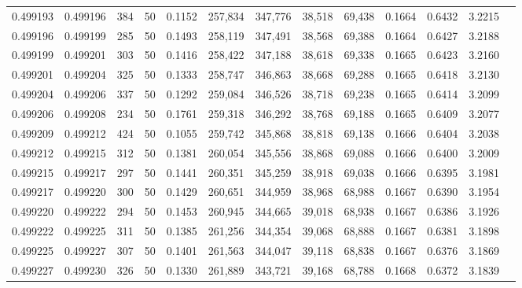 \begin{tabular}{rrrrrrrrrrrrr}
0.499193 & 0.499196 & 384 &  50 &                                     0.1152 & 257,834 & 347,776 &  38,518 &  69,438 & 0.1664 & 0.6432 & 3.2215 \\
0.499196 & 0.499199 & 285 &  50 &                                     0.1493 & 258,119 & 347,491 &  38,568 &  69,388 & 0.1664 & 0.6427 & 3.2188 \\
0.499199 & 0.499201 & 303 &  50 &                                     0.1416 & 258,422 & 347,188 &  38,618 &  69,338 & 0.1665 & 0.6423 & 3.2160 \\
0.499201 & 0.499204 & 325 &  50 &                                     0.1333 & 258,747 & 346,863 &  38,668 &  69,288 & 0.1665 & 0.6418 & 3.2130 \\
0.499204 & 0.499206 & 337 &  50 &                                     0.1292 & 259,084 & 346,526 &  38,718 &  69,238 & 0.1665 & 0.6414 & 3.2099 \\
0.499206 & 0.499208 & 234 &  50 &                                     0.1761 & 259,318 & 346,292 &  38,768 &  69,188 & 0.1665 & 0.6409 & 3.2077 \\
0.499209 & 0.499212 & 424 &  50 &                                     0.1055 & 259,742 & 345,868 &  38,818 &  69,138 & 0.1666 & 0.6404 & 3.2038 \\
0.499212 & 0.499215 & 312 &  50 &                                     0.1381 & 260,054 & 345,556 &  38,868 &  69,088 & 0.1666 & 0.6400 & 3.2009 \\
0.499215 & 0.499217 & 297 &  50 &                                     0.1441 & 260,351 & 345,259 &  38,918 &  69,038 & 0.1666 & 0.6395 & 3.1981 \\
0.499217 & 0.499220 & 300 &  50 &                                     0.1429 & 260,651 & 344,959 &  38,968 &  68,988 & 0.1667 & 0.6390 & 3.1954 \\
0.499220 & 0.499222 & 294 &  50 &                                     0.1453 & 260,945 & 344,665 &  39,018 &  68,938 & 0.1667 & 0.6386 & 3.1926 \\
0.499222 & 0.499225 & 311 &  50 &                                     0.1385 & 261,256 & 344,354 &  39,068 &  68,888 & 0.1667 & 0.6381 & 3.1898 \\
0.499225 & 0.499227 & 307 &  50 &                                     0.1401 & 261,563 & 344,047 &  39,118 &  68,838 & 0.1667 & 0.6376 & 3.1869 \\
0.499227 & 0.499230 & 326 &  50 &                                     0.1330 & 261,889 & 343,721 &  39,168 &  68,788 & 0.1668 & 0.6372 & 3.1839 \\

\end{tabular}
